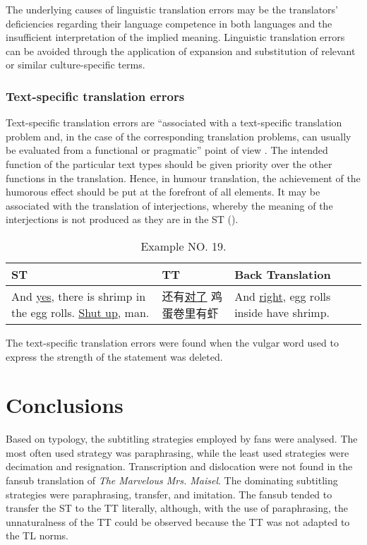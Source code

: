 \documentclass[english]{textolivre}
\begin{document}
The underlying causes of linguistic translation errors may be the translators' deficiencies regarding their language competence in both languages and the insufficient interpretation of the implied meaning. Linguistic translation errors can be avoided through the application of expansion and substitution of relevant or similar culture-specific terms. 

\subsubsection{Text-specific translation errors}
Text-specific translation errors are “associated with a text-specific translation problem and, in the case of the corresponding translation problems, can usually be evaluated from a functional or pragmatic” point of view \cite[p. 127]{nord_text_1997}. The intended function of the particular text types should be given priority over the other functions in the translation. Hence, in humour translation, the achievement of the humorous effect should be put at the forefront of all elements. It may be associated with the translation of interjections, whereby the meaning of the interjections is not produced as they are in the ST (). 

\begin{table}[htpb]
\caption{Example NO. 19.}
\label{tbl19}
\begin{tabularx}{\linewidth}{XXX}
\toprule 
ST  & TT & Back Translation \\ 
\midrule
And \underline{yes}, there is shrimp in the egg rolls. \underline{Shut up}, man.  & 还有\underline{对了} 鸡蛋卷里有虾 & And \underline{right}, egg rolls inside have shrimp. \\ 
\bottomrule
\end{tabularx}
\end{table}

The text-specific translation errors were found when the vulgar word used to express the strength of the statement was deleted.

\section{Conclusions}

Based on \textcite{gottlieb_1992} typology, the subtitling strategies employed by fans were analysed. The most often used strategy was paraphrasing, while the least used strategies were decimation and resignation. Transcription and dislocation were not found in the fansub translation of \textit{The Marvelous Mrs. Maisel}. The dominating subtitling strategies were paraphrasing, transfer, and imitation. The fansub tended to transfer the ST to the TT literally, although, with the use of paraphrasing, the unnaturalness of the TT could be observed because the TT was not adapted to the TL norms. 
\end{document}
